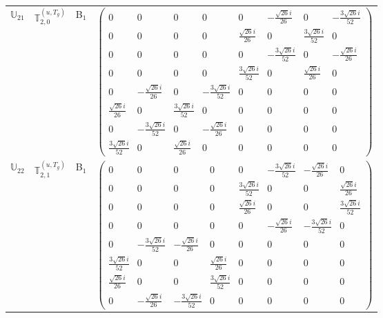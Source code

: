 \documentclass[fleqn,10pt,landscape]{article}
\begin{document}
\begin{itemize}
\begin{center}
\begin{longtable}{c|c|c|c}
$ \mathbb{U}_{21} $ & $\mathbb{T}_{2,0}^{(u,T_{g})}$ & B$_{1}$ & $\begin{pmatrix} 0 & 0 & 0 & 0 & 0 & - \frac{\sqrt{26} i}{26} & 0 & - \frac{3 \sqrt{26} i}{52} \\ 0 & 0 & 0 & 0 & \frac{\sqrt{26} i}{26} & 0 & \frac{3 \sqrt{26} i}{52} & 0 \\ 0 & 0 & 0 & 0 & 0 & - \frac{3 \sqrt{26} i}{52} & 0 & - \frac{\sqrt{26} i}{26} \\ 0 & 0 & 0 & 0 & \frac{3 \sqrt{26} i}{52} & 0 & \frac{\sqrt{26} i}{26} & 0 \\ 0 & - \frac{\sqrt{26} i}{26} & 0 & - \frac{3 \sqrt{26} i}{52} & 0 & 0 & 0 & 0 \\ \frac{\sqrt{26} i}{26} & 0 & \frac{3 \sqrt{26} i}{52} & 0 & 0 & 0 & 0 & 0 \\ 0 & - \frac{3 \sqrt{26} i}{52} & 0 & - \frac{\sqrt{26} i}{26} & 0 & 0 & 0 & 0 \\ \frac{3 \sqrt{26} i}{52} & 0 & \frac{\sqrt{26} i}{26} & 0 & 0 & 0 & 0 & 0 \end{pmatrix}$ \\
$ \mathbb{U}_{22} $ & $\mathbb{T}_{2,1}^{(u,T_{g})}$ & B$_{1}$ & $\begin{pmatrix} 0 & 0 & 0 & 0 & 0 & - \frac{3 \sqrt{26} i}{52} & - \frac{\sqrt{26} i}{26} & 0 \\ 0 & 0 & 0 & 0 & \frac{3 \sqrt{26} i}{52} & 0 & 0 & \frac{\sqrt{26} i}{26} \\ 0 & 0 & 0 & 0 & \frac{\sqrt{26} i}{26} & 0 & 0 & \frac{3 \sqrt{26} i}{52} \\ 0 & 0 & 0 & 0 & 0 & - \frac{\sqrt{26} i}{26} & - \frac{3 \sqrt{26} i}{52} & 0 \\ 0 & - \frac{3 \sqrt{26} i}{52} & - \frac{\sqrt{26} i}{26} & 0 & 0 & 0 & 0 & 0 \\ \frac{3 \sqrt{26} i}{52} & 0 & 0 & \frac{\sqrt{26} i}{26} & 0 & 0 & 0 & 0 \\ \frac{\sqrt{26} i}{26} & 0 & 0 & \frac{3 \sqrt{26} i}{52} & 0 & 0 & 0 & 0 \\ 0 & - \frac{\sqrt{26} i}{26} & - \frac{3 \sqrt{26} i}{52} & 0 & 0 & 0 & 0 & 0 \end{pmatrix}$ \\

\end{longtable}
\end{center}
\end{itemize}
\end{document}
